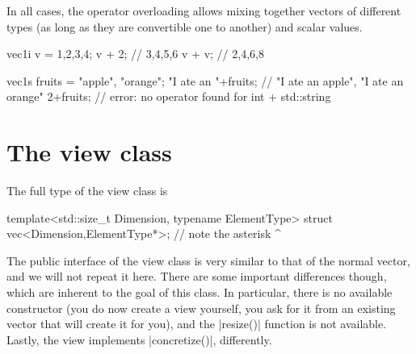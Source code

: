 \documentclass[12pt]{report}
\newenvironment{example}
{
    \begin{mdframed}[style=example,frametitle={Example}]
}
{
    \end{mdframed}
}
\begin{document}

In all cases, the operator overloading allows mixing together vectors of different types (as long as they are convertible one to another) and scalar values.

\begin{example}
\begin{cppcode}
vec1i v = {1,2,3,4};
v + 2; // {3,4,5,6}
v + v; // {2,4,6,8}

vec1s fruits = {"apple", "orange"};
"I ate an "+fruits; // {"I ate an apple", "I ate an orange"}
2+fruits;           // error: no operator found for int + std::string
\end{cppcode}
\end{example}

\section{The view class \label{SEC:core:view}}

The full type of the view class is
\begin{cppcode}
template<std::size_t Dimension, typename ElementType>
struct vec<Dimension,ElementType*>;
//            note the asterisk ^
\end{cppcode}

The public interface of the view class is very similar to that of the normal vector, and we will not repeat it here. There are some important differences though, which are inherent to the goal of this class. In particular, there is no available constructor (you do now create a view yourself, you ask for it from an existing vector that will create it for you), and the \cppinline|resize()| function is not available. Lastly, the view implements \cppinline|concretize()|, differently.
\end{document}
